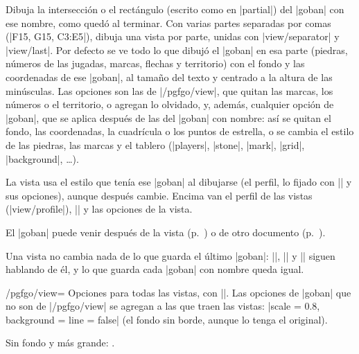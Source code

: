 	\begin{command}{\pgfgoview{}}
		Dibuja la intersección o el rectángulo (escrito como en |partial|) del |goban| con ese nombre, como quedó al terminar. Con varias partes separadas por comas (|{F15, G15, C3:E5}|), dibuja una vista por parte, unidas con |view/separator| y |view/last|. Por defecto se ve todo lo que dibujó el |goban| en esa parte (piedras, números de las jugadas, marcas, flechas y territorio) con el fondo y las coordenadas de ese |goban|, al tamaño del texto y centrado a la altura de las minúsculas. Las opciones son las de |/pgfgo/view|, que quitan las marcas, los números o el territorio, o agregan lo olvidado, y, además, cualquier opción de |goban|, que se aplica después de las del |goban| con nombre: así se quitan el fondo, las coordenadas, la cuadrícula o los puntos de estrella, o se cambia el estilo de las piedras, las marcas y el tablero (|players|, |stone|, |mark|, |grid|, |background|, \ldots).

		La vista usa el estilo que tenía ese |goban| al dibujarse (el perfil, lo fijado con |\pgfgoset| y sus opciones), aunque después cambie. Encima van el perfil de las vistas (|view/profile|), || y las opciones de la vista.

		El |goban| puede venir después de la vista (p.~\pageref{subsec:vistas-antes}) o de otro documento (p.~\pageref{subsec:exportar}).

		Una vista no cambia nada de lo que guarda el último |goban|: |\pgfgoscore|, |\pgfgoprisoners| y |\pgfgomovenotes| siguen hablando de él, y lo que guarda cada |goban| con nombre queda igual.

		\begin{codeexample}[]
			\begin{goban}[5, name = tablero2]
			\end{goban}

		\end{codeexample}
	\end{command}

	\begin{key}{/pgfgo/view=}
		Opciones para todas las vistas, con |\pgfgoset|. Las opciones de |goban| que no son de |/pgfgo/view| se agregan a las que traen las vistas: |scale = 0.8, background = {line = false}| (el fondo sin borde, aunque lo tenga el original).

		\begin{codeexample}[]
			Sin fondo y más grande: .
		\end{codeexample}
	\end{key}

